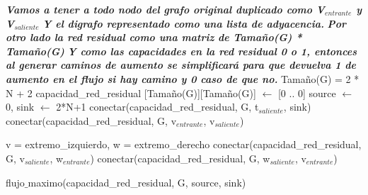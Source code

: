 \begin{algorithmic}
	\State \textit{\textbf{Vamos a tener a todo nodo del grafo original duplicado como V$_{entrante}$ y V$_{saliente}$}}
	\State \textit{\textbf{Y el digrafo representado como una lista de adyacencia.}}
	\State \textit{\textbf{Por otro lado la red residual como una matriz de Tamaño(G) * Tamaño(G)}}
	\State \textit{\textbf{Y como las capacidades en la red residual 0 o 1, entonces al generar caminos de aumento se simplificará para que devuelva 1 de aumento en el flujo si hay camino y 0 caso de que no.}}
	\State Tamaño(G) = 2 * N + 2
	\State capacidad_red_residual [Tamaño(G)][Tamaño(G)] $\leftarrow$ [0 .. 0] 
	\State source $\leftarrow$ 0, sink $\leftarrow$ 2*N+1
			\State conectar(capacidad_red_residual, G, t$_{saliente}$, sink) 
		\EndIf
	\EndFor
		\State conectar(capacidad_red_residual, G, v$_{entrante}$, v$_{saliente}$)
	\EndFor

		\State v = extremo_izquierdo, w = extremo_derecho
		\State conectar(capacidad_red_residual, G, v$_{saliente}$, w$_{entrante}$)
		\State conectar(capacidad_red_residual, G, w$_{saliente}$, v$_{entrante}$)
	\EndFor
	
	\Return flujo$\_$maximo(capacidad_red_residual, G, source, sink)

\EndFunction

\end{algorithmic}


